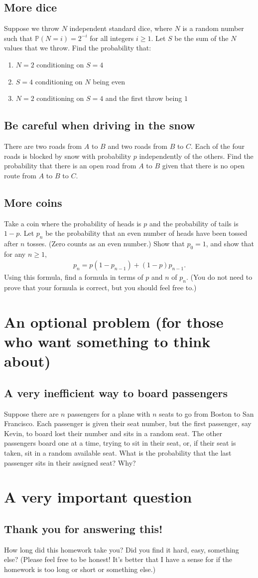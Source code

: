 \documentclass[12pt,reqno]{amsart}
\theoremstyle{definition}
\theoremstyle{remark}
\numberwithin{equation}{section}
\begin{document}
\subsection{More dice}
Suppose we throw $N$ independent standard dice, where $N$ is a random number such that $\mathbb{P}(N=i)=2^{-i}$ for all integers $i\geq1$. Let $S$ be the sum of the $N$ values that we throw. Find the probability that:
\begin{enumerate}
\item $N=2$ conditioning on $S=4$
\item $S=4$ conditioning on $N$ being even
\item $N=2$ conditioning on $S=4$ and the first throw being $1$
\end{enumerate}
\subsection{Be careful when driving in the snow}
There are two roads from $A$ to $B$ and two roads from $B$ to $C$. Each of the four roads is blocked by snow with probability $p$ independently of the others. Find the probability that there is an open road from $A$ to $B$ given that there is no open route from $A$ to $B$ to $C$.
\subsection{More coins}
Take a coin where the probability of heads is $p$ and the probability of tails is $1-p$. Let $p_{n}$ be the probability that an even number of heads have been tossed after $n$ tosses. (Zero counts as an even number.) Show that $p_{0}=1$, and show that for any $n\geq1$, 
%
\begin{align*}
p_{n}=p(1-p_{n-1})+(1-p)p_{n-1}.
\end{align*}
%
Using this formula, find a formula in terms of $p$ and $n$ of $p_{n}$. (You do not need to prove that your formula is correct, but you should feel free to.)
%
%
%
\section{An optional problem (for those who want something to think about)}
\subsection{A very inefficient way to board passengers}
Suppose there are $n$ passengers for a plane with $n$ seats to go from Boston to San Francisco. Each passenger is given their seat number, but the first passenger, say Kevin, to board lost their number and sits in a random seat. The other passengers board one at a time, trying to sit in their seat, or, if their seat is taken, sit in a random available seat. What is the probability that the last passenger sits in their assigned seat? Why?
\section{A very important question}
\subsection{Thank you for answering this!}
How long did this homework take you? Did you find it hard, easy, something else? (Please feel free to be honest! It's better that I have a sense for if the homework is too long or short or something else.)
\end{document}
